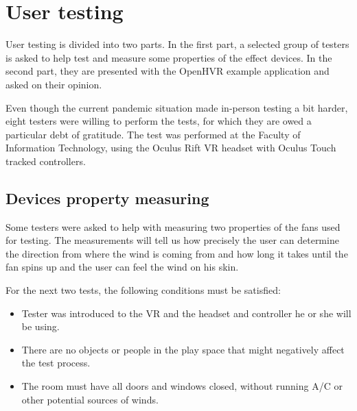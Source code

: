 \chapter{User testing}\label{usertesting}

User testing is divided into two parts. In the first part,
a selected group of testers is asked to help test and measure some properties
of the effect devices. In the second part, they are presented with the OpenHVR 
example application and asked on their opinion.


Even though the current pandemic situation made in-person testing a bit harder,
eight testers were willing to perform the tests, for which they are owed
a particular debt of gratitude.
The test was performed at the Faculty of Information Technology, using
the Oculus Rift VR headset with Oculus Touch tracked controllers.


\hypertarget{x-devices-property-measuring}{\section{Devices property measuring}}
Some testers were asked to help with measuring two properties of the fans used
for testing. The measurements will tell us how precisely the user can determine the
direction from where the wind is coming from and how long it takes until the
fan spins up and the user can feel the wind on his skin.


For the next two tests, the following conditions must be satisfied:


\begin{itemize}
    \itemsep0em

\item Tester was introduced to the VR and the headset and controller
he or she will be using.

\item There are no objects or people in the play space that might negatively affect
the test process.

\item The room must have all doors and windows closed, without running A/C
or other potential sources of winds.

\end{itemize}


